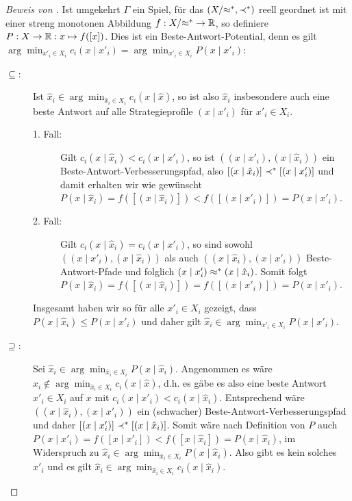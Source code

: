 \begin{proof}[Beweis von ]
	Ist umgekehrt $\Gamma$ ein Spiel, für das $(X/{\approx^\ast}, \prec^\ast)$ reell geordnet ist mit einer streng monotonen Abbildung $f: X/{\approx^\ast} \to \mathbb{R}$, so definiere $P: X \to \mathbb{R}: x \mapsto f([x])$. Dies ist ein Beste-Antwort-Potential, denn es gilt $\arg \min_{x'_i \in X_i}c_i(x \mid x'_i) = \arg \min_{x'_i \in X_i} P(x \mid x'_i)$:
	\begin{description}
		\item[\glqq$\bm{\subseteq}$\grqq:] Ist $\hat{x}_i \in \arg \min_{\hat{x}_i \in X_i}c_i(x \mid \hat{x})$, so ist also $\hat{x}_i$ insbesondere auch eine beste Antwort auf alle Strategieprofile $(x \mid x'_i)$ für $x'_i \in X_i$.
			\begin{description}
				\item[1. Fall:] Gilt $c_i(x \mid \hat{x}_i) < c_i(x \mid x'_i)$, so ist $((x \mid x'_i), (x \mid \hat{x}_i))$ ein Beste-Antwort-Verbesserungspfad, also $[(x \mid \hat{x}_i)] \prec^\ast [(x \mid x'_i)]$ und damit erhalten wir wie gewünscht $P(x \mid \hat{x}_i) = f([(x \mid \hat{x}_i)]) < f ([(x \mid x'_i)]) = P(x \mid x'_i)$.
				\item[2. Fall:] Gilt $c_i(x \mid \hat{x}_i) = c_i(x \mid x'_i)$, so sind sowohl $((x \mid x'_i), (x \mid \hat{x}_i))$ als auch $((x \mid \hat{x}_i), (x \mid x'_i))$ Beste-Antwort-Pfade und folglich $(x \mid x'_i) \approx^\ast (x \mid \hat{x}_i)$. Somit folgt $P(x \mid \hat{x}_i) = f([(x \mid \hat{x}_i)]) = f([(x \mid x'_i)]) = P(x \mid x'_i)$.
			\end{description}
			Insgesamt haben wir so für alle $x'_i \in X_i$ gezeigt, dass $P(x \mid \hat{x}_i) \leq P(x \mid x'_i)$ und daher gilt $\hat{x}_i \in \arg \min_{x'_i \in X_i} P(x \mid x'_i)$.
		\item[\glqq$\bm{\supseteq}$\grqq:] Sei $\hat{x}_i \in \arg \min_{\hat{x}_i \in X_i}P(x \mid \hat{x}_i)$. Angenommen es wäre $\hat{x}_i \notin \arg \min_{\hat{x}_i \in X_i}c_i(x \mid \hat{x})$, d.h. es gäbe es also eine beste Antwort $x'_i \in X_i$ auf $x$ mit $c_i(x \mid x'_i) < c_i(x \mid \hat{x}_i)$. Entsprechend wäre $((x \mid \hat{x}_i), (x \mid x'_i))$ ein (schwacher) Beste-Antwort-Verbesserungspfad und daher $[(x \mid x'_i)] \prec^\ast [(x \mid \hat{x}_i)]$. Somit wäre nach Definition von $P$ auch $P(x \mid x'_i) = f([x \mid x'_i]) < f([x \mid \hat{x}_i]) = P(x \mid \hat{x}_i)$, im Widerspruch zu $\hat{x}_i \in \arg \min_{\hat{x}_i \in X_i}P(x \mid \hat{x}_i)$. Also gibt es kein solches $x'_i$ und es gilt $\hat{x}_i \in \arg \min_{\hat{x}_i \in X_i}c_i(x \mid \hat{x}_i)$. \qedhere
	\end{description}
\end{proof}

